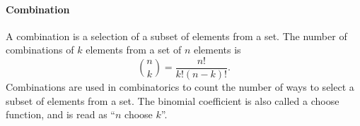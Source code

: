 \paragraph{Combination}  A combination is a selection of a subset of elements from a set.
The number of combinations of $k$ elements from a set of $n$ elements is $$\binom{n}{k} =
\frac{n!}{k!(n - k)!}\text{.}$$  Combinations are used in combinatorics to count the
number of ways to select a subset of elements from a set.  The binomial coefficient
is also called a choose function, and is read as ``$n$ choose $k$''.

%
%
%
%
%
%
%
%
%

